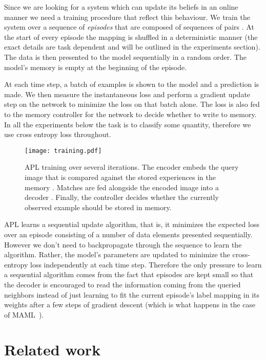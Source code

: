 \documentclass{article} \usepackage{iclr2019_conference,times}
\begin{document}
Since we are looking for a system which can update its beliefs in an online manner we need a training procedure that reflect this behaviour. We train the system over a sequence of \textit{episodes} that are composed of sequences of pairs . At the start of every episode the mapping  is shuffled in a deterministic manner (the exact details are task dependent and will be outlined in the experiments section). The data is then presented to the model sequentially in a random order. The model's memory is empty at the beginning of the episode.

At each time step, a batch of examples is shown to the model and a prediction is made. We then measure the instantaneous loss  and perform a gradient update step on the network to minimize the loss on that batch alone. The loss is also fed to the memory controller for the network to decide whether to write to memory. In all the experiments below the task is to classify some quantity, therefore we use cross entropy loss throughout. 

\begin{figure}[ht]
\begin{center}
\texttt{[image: training.pdf]}
\end{center}
\caption{APL training over several iterations. The encoder  embeds the query image that is compared against the stored experiences in the memory . Matches are fed alongside the encoded image into a decoder . Finally, the controller  decides whether the currently observed example should be stored in memory.}
\end{figure}

APL learns a sequential update algorithm, that is, it minimizes the expected loss over an episode consisting of a number of data elements presented sequentially. However we don't need to backpropagate through the sequence to learn the algorithm. Rather, the model's parameters are updated to minimize the cross-entropy loss independently at each time step. Therefore the only pressure to learn a sequential algorithm comes from the fact that episodes are kept small so that the decoder is encouraged to read the information coming from the queried neighbors instead of just learning to fit the current episode's label mapping in its weights after a few steps of gradient descent (which is what happens in the case of MAML~\citep{finn2017model}).



\section{Related work}
\end{document}
